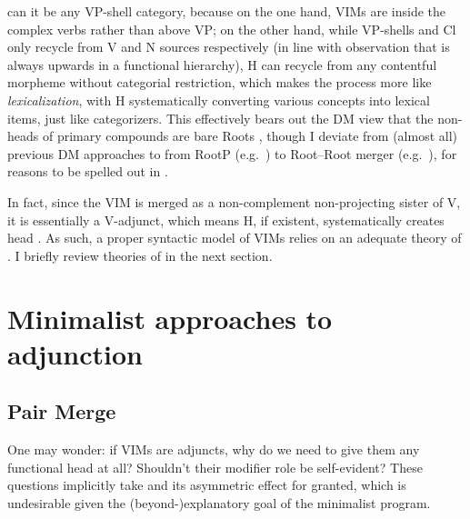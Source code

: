 \documentclass[output=paper]{langsci/langscibook}
\begin{document}
can it be any VP-shell category, because on the one hand, \glspl{VIM} are
inside the complex verbs rather than above VP; on the other hand, while
VP-shells and Cl only recycle from V and N sources respectively (in line with
 observation that  is
always upwards in a functional hierarchy), H can recycle from any contentful
morpheme without categorial restriction, which makes the process more like
\emph{lexicalization}, with H systematically converting various concepts into
lexical items, just like categorizers. This effectively bears out the \gls{DM} view
that the non-heads of primary compounds are bare Roots
\citep[cf.][]{deBelder2017}, though I deviate from (almost all) previous \gls{DM}
approaches to  from RootP  (e.g.\ \citealt{Harley2009})
to Root--Root merger (e.g.\ \citealt{Zhang2007,Bauke2016}), for
reasons to be spelled out in .

In fact, since the \gls{VIM} is merged as a
non-complement non-projecting sister of V, it is essentially a V-adjunct, which
means H, if existent, systematically creates head . As such, a proper
syntactic model of \glspl{VIM} relies on an adequate theory of . I
briefly review theories of  in the next section.

\section{Minimalist approaches to adjunction}\label{sec3}
\subsection{Pair Merge}\label{sec3.1}

One may wonder: if \glspl{VIM} are adjuncts, why do we need to give them any
functional head at all? Shouldn't their modifier role be self-evident? These
questions implicitly take  and its asymmetric effect for granted,
which is undesirable given the (beyond-)explanatory goal of the minimalist
program.
\end{document}
